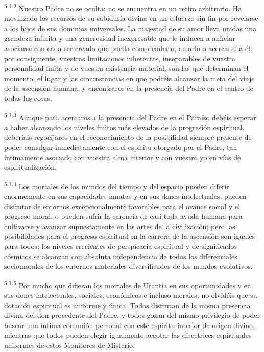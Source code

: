 \par
\textsuperscript{5:1.2} Nuestro Padre no se oculta; no se encuentra en un retiro arbitrario. Ha movilizado los recursos de su sabiduría divina en un esfuerzo sin fin por revelarse a los hijos de sus dominios universales. La majestad de su amor lleva unidas una grandeza infinita y una generosidad inexpresable que le inducen a anhelar asociarse con cada ser creado que pueda comprenderlo, amarlo o acercarse a él; por consiguiente, vuestras limitaciones inherentes, inseparables de vuestra personalidad finita y de vuestra existencia material, son las que determinan el momento, el lugar y las circunstancias en que podréis alcanzar la meta del viaje de la ascensión humana, y encontraros en la presencia del Padre en el centro de todas las cosas.

\par
\textsuperscript{5:1.3} Aunque para acercaros a la presencia del Padre en el Paraíso debéis esperar a haber alcanzado los niveles finitos más elevados de la progresión espiritual, deberíais regocijaros en el reconocimiento de la posibilidad siempre presente de poder comulgar inmediatamente con el espíritu otorgado por el Padre, tan íntimamente asociado con vuestra alma interior y con vuestro yo en vías de espiritualización.

\par
\textsuperscript{5:1.4} Los mortales de los mundos del tiempo y del espacio pueden diferir enormemente en sus capacidades innatas y en sus dones intelectuales, pueden disfrutar de entornos excepcionalmente favorables para el avance social y el progreso moral, o pueden sufrir la carencia de casi toda ayuda humana para cultivarse y avanzar supuestamente en las artes de la civilización; pero las posibilidades para el progreso espiritual en la carrera de la ascensión son iguales para todos; los niveles crecientes de perspicacia espiritual y de significados cósmicos se alcanzan con absoluta independencia de todos los diferenciales sociomorales de los entornos materiales diversificados de los mundos evolutivos.

\par
\textsuperscript{5:1.5} Por mucho que difieran los mortales de Urantia en sus oportunidades y en sus dones intelectuales, sociales, económicos e incluso morales, no olvidéis que su dotación espiritual es uniforme y única. Todos disfrutan de la misma presencia divina del don procedente del Padre, y todos gozan del mismo privilegio de poder buscar una íntima comunión personal con este espíritu interior de origen divino, mientras que todos pueden elegir igualmente aceptar las directrices espirituales uniformes de estos Monitores de Misterio.

